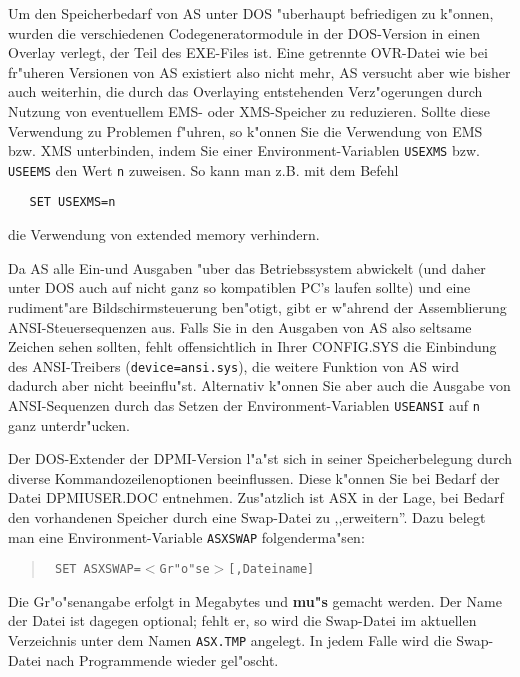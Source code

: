 \documentclass[12pt,a4paper,twoside]{report}
\newcommand{\bb}[1]{{\bf #1}}
\newcommand{\tty}[1]{{\tt #1}}
\begin{document}
Um den  Speicherbedarf von AS unter DOS "uberhaupt
befriedigen zu k"onnen, wurden die verschiedenen Codegeneratormodule in
der DOS-Version in einen Overlay verlegt, der Teil des EXE-Files ist.
Eine getrennte OVR-Datei wie bei fr"uheren Versionen von AS existiert also
nicht mehr, AS versucht aber wie bisher auch weiterhin, die durch das
Overlaying entstehenden Verz"ogerungen durch Nutzung von eventuellem EMS-
oder XMS-Speicher zu reduzieren.  Sollte diese Verwendung zu Problemen
f"uhren, so k"onnen Sie die Verwendung von EMS bzw. XMS unterbinden, indem
Sie einer Environment-Variablen \tty{USEXMS} bzw. \tty{USEEMS} den Wert
\tty{n} zuweisen.  So kann man z.B. mit dem Befehl
\begin{verbatim}
   SET USEXMS=n
\end{verbatim}
die Verwendung von extended memory verhindern.
\par
Da AS alle Ein-und Ausgaben "uber das Betriebssystem abwickelt (und daher
unter DOS auch auf nicht ganz so kompatiblen PC's laufen sollte) und eine
rudiment"are Bildschirmsteuerung ben"otigt, gibt er w"ahrend der
Assemblierung ANSI-Steuersequenzen aus.
Falls Sie in den Ausgaben von AS  also seltsame
Zeichen sehen sollten, fehlt offensichtlich in Ihrer CONFIG.SYS die
Einbindung des ANSI-Trei\-bers (\tty{device=\-ansi.sys}), die weitere Funktion
von AS  wird dadurch aber nicht beeinflu"st. Alternativ
k"onnen Sie aber auch die Ausgabe von ANSI-Sequenzen durch das Setzen der
Environment-Variablen \tty{USEANSI} auf \tty{n} ganz unterdr"ucken.

Der DOS-Extender der DPMI-Version  l"a"st sich in
seiner Speicherbelegung durch diverse Kommandozeilenoptionen beeinflussen.
Diese k"onnen Sie bei Bedarf der Datei DPMIUSER.DOC entnehmen.
Zus"atzlich ist ASX in der Lage, bei Bedarf den vorhandenen Speicher
durch eine Swap-Datei zu ,,erweitern''.  Dazu belegt man eine
Environment-Variable \tty{ASXSWAP} folgenderma"sen:
\begin{quote}{\tt
  SET ASXSWAP=$<$Gr"o"se$>$[,Dateiname]
}\end{quote}
Die Gr"o"senangabe erfolgt in Megabytes und \bb{mu"s} gemacht werden.  Der
Name der Datei ist dagegen optional; fehlt er, so wird die Swap-Datei im
aktuellen Verzeichnis unter dem Namen \tty{ASX.TMP} angelegt.  In jedem
Falle wird die Swap-Datei nach Programmende wieder gel"oscht.
\end{document}
